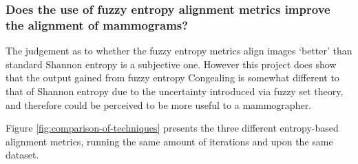 \subsubsection{Does the use of fuzzy entropy alignment metrics improve the alignment of mammograms?}

The judgement as to whether the fuzzy entropy metrics align images `better' than standard Shannon entropy is a subjective one. However this project does show that the output gained from fuzzy entropy \gls{Congealing} is somewhat different to that of Shannon entropy due to the uncertainty introduced via fuzzy set theory, and therefore could be perceived to be more useful to a mammographer.

Figure \ref{fig:comparison-of-techniques} presents the three different entropy-based alignment metrics, running the same amount of iterations and upon the same dataset.

